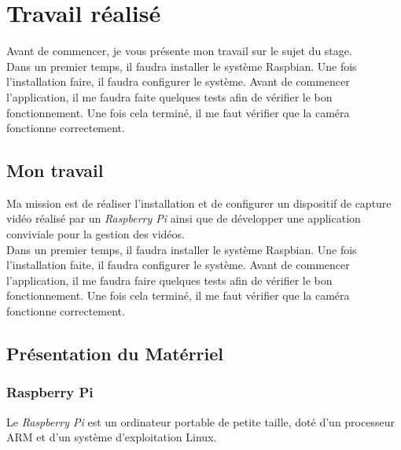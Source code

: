 \chapter{Travail réalisé}
Avant de commencer, je vous présente mon travail sur le sujet du stage.\\[0.2cm]
Dans un premier temps, il faudra installer le système Raspbian. Une fois l’installation faire, il faudra configurer le système. Avant de commencer l’application, il me faudra faite quelques tests afin de vérifier le bon fonctionnement. Une fois cela terminé, il me faut vérifier que la caméra fonctionne correctement.

    \section{Mon travail}
    \begin{flushleft}
        Ma mission est de réaliser l'installation et de configurer un dispositif de capture vidéo réalisé par un \textit{Raspberry Pi} ainsi que de développer une application conviviale pour la gestion des vidéos.\\[0.2cm]
    
        Dans un premier temps, il faudra installer le système Raspbian.
        Une fois l'installation faite, il faudra configurer le système.
        Avant de commencer l'application, il me faudra faire quelques tests afin de vérifier le bon fonctionnement.
        Une fois cela terminé, il me faut vérifier que la caméra fonctionne correctement.    
    \end{flushleft}

    \section{Présentation du Matérriel}
        \subsection{Raspberry Pi}
        Le \textit{Raspberry Pi} est un ordinateur portable de petite taille, doté d'un processeur ARM et d'un système d'exploitation Linux.



